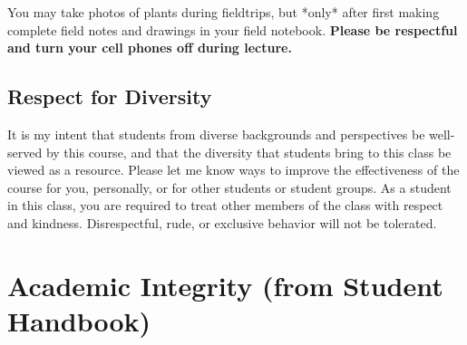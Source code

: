 \documentclass{tufte-handout}
\begin{document}
\begin{fullwidth}
You may take photos of plants during fieldtrips, but *only* after first making complete field notes and drawings in your field notebook. \textbf{Please be respectful and turn your cell phones off during lecture.}

\subsection{Respect for Diversity}

It is my intent that students from diverse backgrounds and perspectives be well-served by this course, and that the diversity that students bring to this class be viewed as a resource. Please let me know ways to improve the effectiveness of the course for you, personally, or for other students or student groups. As a student in this class, you are required to treat other members of the class with respect and kindness. Disrespectful, rude, or exclusive behavior will not be tolerated.


\end{fullwidth}

\section{Academic Integrity (from Student Handbook)}


\end{document}

